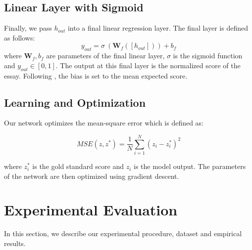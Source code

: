 \documentclass[letterpaper]{article}
\begin{document}
\subsection{Linear Layer with Sigmoid}
Finally, we pass $h_{out}$ into a final linear regression layer. The final layer is defined as follows:
\begin{equation}
y_{out} = \sigma \: (\textbf{W}_f([h_{out}])) + b_f
\end{equation}
where $\textbf{W}_f, b_f$ are parameters of the final linear layer, $\sigma$ is the sigmoid function and $y_{out} \in [0,1]$. The output at this final layer is the normalized score of the essay. Following \cite{DBLP:conf/emnlp/TaghipourN16}, the bias is set to the mean expected score. 
 
\subsection{Learning and Optimization}
Our network optimizes the mean-square error which is defined as:

\begin{equation}
MSE(z,z^{*}) = \frac{1}{N} \sum^{N}_{i=1} (z_i - z^*_i)^2
\end{equation}

\noindent where $z_{i}^{*}$ is the gold standard score and $z_i$ is the model output. The parameters of the network are then optimized using gradient descent.

\section{Experimental Evaluation}
In this section, we describe our experimental procedure, dataset and empirical results. 
\end{document}
